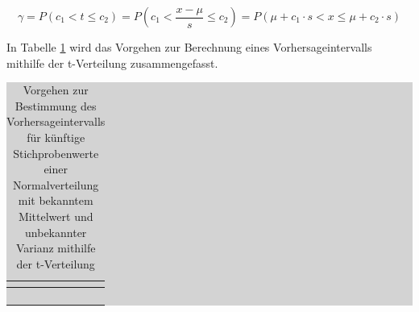 \begin{equation}\label{eq:fivehundredfourtyone}
\gamma =P\left(c_{1} <t\le c_{2} \right)=P\left(c_{1} <\dfrac{x-\mu }{s} \le c_{2} \right)=P\left(\mu +c_{1} \cdot s<x\le \mu +c_{2} \cdot s\right)
\end{equation}

\noindent In Tabelle \ref{tab:fivesixteen} wird das Vorgehen zur Berechnung eines Vorhersageintervalls mithilfe der t-Verteilung zusammengefasst.

\begin{table}[H]
\setlength{\arrayrulewidth}{.1em}
\caption{Vorgehen zur Bestimmung des Vorhersageintervalls f\"{u}r k\"{u}nftige Stichprobenwerte einer Normalverteilung mit bekanntem Mittelwert und unbekannter Varianz mithilfe der t-Verteilung}
\setlength{\fboxsep}{0pt}%
\colorbox{lightgray}{%
%
\begin{tabular}{| c | c |}
\hline
\parbox[c][0.3in][c]{0.4in}{\smallskip\centering\textbf{\selectfont{Nr.}}} & 
\parbox[c][0.3in][c]{6.2in}{\smallskip\centering\textbf{\selectfont{Prozessschritt}}}\\ \hline

\parbox[c][0.3in][c]{0.4in}{\centering{}\selectfont{1}} & 
\parbox[c][0.3in][c]{6.2in}{\centering{}\selectfont{Wahl einer Konfidenzzahl $\gamma$}}\\ \hline

\parbox[c][0.9in][c]{0.4in}{\centering{}\selectfont{2}} & 
\parbox[c][0.9in][c]{6.2in}{\centering{}}\\ \hline

\parbox[c][0.9in][c]{0.4in}{\centering{}\selectfont{3}} & 
\parbox[c][0.9in][c]{6.2in}{\centering{}}\\ \hline

\parbox[c][0.9in][c]{0.4in}{\centering{}\selectfont{4}} & 
\parbox[c][0.9in][c]{6.2in}{\centering{}}\\ \hline

\end{tabular}%
}
\label{tab:fivesixteen}
\end{table}

